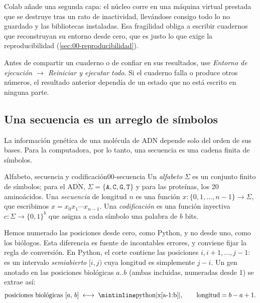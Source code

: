 Colab añade una segunda capa: el núcleo corre en una máquina virtual prestada que se destruye tras un rato de inactividad, llevándose consigo todo lo no guardado y las bibliotecas instaladas. Esa fragilidad obliga a escribir cuadernos que reconstruyan su entorno desde cero, que es justo lo que exige la reproducibilidad (\cref{sec:00-reproducibilidad}).

\begin{cuidado}
Antes de compartir un cuaderno o de confiar en sus resultados, use \emph{Entorno de ejecución $\to$ Reiniciar y ejecutar todo}. Si el cuaderno falla o produce otros números, el resultado anterior dependía de un estado que no está escrito en ninguna parte.
\end{cuidado}

\subsection{Una secuencia es un arreglo de símbolos}

La información genética de una molécula de ADN depende solo del orden de sus bases. Para la computadora, por lo tanto, una secuencia es una cadena finita de símbolos.

\begin{definicion}{Alfabeto, secuencia y codificación}{00-secuencia}
Un \emph{alfabeto} $\Sigma$ es un conjunto finito de símbolos; para el ADN, $\Sigma=\{\texttt{A},\texttt{C},\texttt{G},\texttt{T}\}$ y para las proteínas, los 20 aminoácidos. Una \emph{secuencia} de longitud $n$ es una función $x:\{0,1,\ldots,n-1\}\to\Sigma$, que escribimos $x=x_0x_1\cdots x_{n-1}$. Una \emph{codificación} es una función inyectiva $c:\Sigma\to\{0,1\}^b$ que asigna a cada símbolo una palabra de $b$ bits.
\end{definicion}

Hemos numerado las posiciones desde cero, como Python, y no desde uno, como los biólogos. Esta diferencia es fuente de incontables errores, y conviene fijar la regla de conversión. En Python, el corte  contiene las posiciones $i, i+1, \ldots, j-1$: es un intervalo \emph{semiabierto} $[i,j)$ cuya longitud es simplemente $j-i$. Un gen anotado en las posiciones biológicas $a..b$ (ambas incluidas, numeradas desde 1) se extrae así:
\begin{equation}\label{eq:00-indices}
\text{posiciones biológicas } [a,\,b] \;\longleftrightarrow\; \text{\py{x[a-1:b]}}, \qquad \text{longitud} = b-a+1.
\end{equation}

